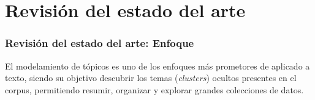 \documentclass[
	spanish, %
	aspectratio=43, %
	hyperref={pdfencoding=auto,psdextra},
	xcolor={dvipsnames,table,usenames}
]{beamer}
\begin{document}
\begin{frame}

\end{frame}


\section{Revisión del estado del arte}

\begin{frame}

\frametitle{Revisión del estado del arte: Enfoque}
El modelamiento de tópicos es uno de los enfoques más prometores de  aplicado a texto, siendo su objetivo descubrir los temas (\textit{clusters}) ocultos presentes en el corpus, permitiendo resumir, organizar y explorar grandes colecciones de datos.



\end{frame}
\end{document}
